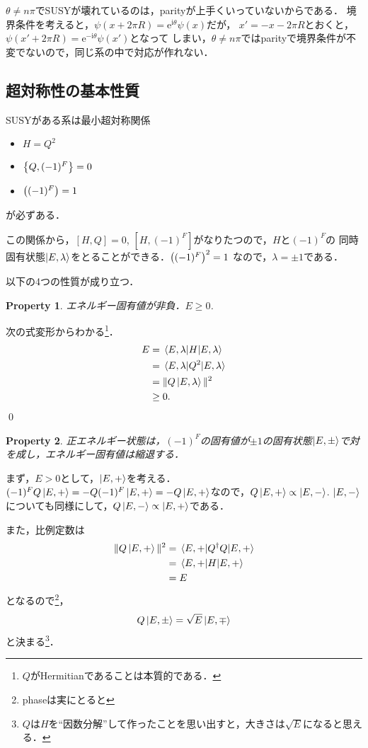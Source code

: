 \documentclass[english, dvipdfmx, a4paper]{jsarticle}
\theoremstyle{break}
\newtheorem{prop}{Property}
\renewcommand{\i}{\mathrm{i}}
\newcommand{\e}{\mathrm{e}}
\begin{document}
	$\theta \neq n\pi$でSUSYが壊れているのは，parityが上手くいっていないからである．
	境界条件を考えると，$\psi(x+2\pi R) = \e^{\i\theta}\psi(x)$だが，
	$x' = -x-2\pi R$とおくと，$\psi(x'+2\pi R)=\e^{-\i\theta}\psi(x')$となって
	しまい，$\theta\neq n\pi$ではparityで境界条件が不変でないので，同じ系の中で対応が作れない．
	\subsection{超対称性の基本性質}

	SUSYがある系は最小超対称関係
	\begin{itemize}
		\item $H=Q^2$
		\item $\qty{Q, (-1)^{F}}=0$
		\item $\qty((-1)^{F})=1$
	\end{itemize}
	が必ずある．

	この関係から，$[H, Q]=0$, $[H, (-1)^F]$がなりたつので，$H$と$(-1)^{F}$の
	同時固有状態$\ket{E, \lambda}$をとることができる．$\qty((-1)^{F})^2=1$
	なので，$\lambda = \pm1$である．



	以下の4つの性質が成り立つ．
	\begin{prop}
		エネルギー固有値が非負．$E\geq0$.
	\end{prop}
	次の式変形からわかる\footnote{$Q$がHermitianであることは本質的である．}．
	\begin{align}
		E &= \mel{E, \lambda}{H}{E, \lambda}\\
		  &= \mel{E, \lambda}{Q^2}{E, \lambda}\\
		  &= \|Q\ket{E, \lambda}\|^2\\
		  &\geq0.
	\end{align}\qed
	\begin{prop}
		正エネルギー状態は，$(-1)^{F}$の固有値が$\pm1$の固有状態$\ket{E, \pm}$で対を成し，エネルギー固有値は縮退する．
	\end{prop}
	まず，$E>0$として，$\ket{E, +}$を考える．
	$(-1)^{F}Q\ket{E, +} = -Q(-1)^{F}\ket{E, +} = -Q\ket{E, +}$なので，$Q\ket{E, +}\propto\ket{E, -}$.
	$\ket{E, -}$についても同様にして，$Q\ket{E, -}\propto\ket{E, +}$である．

	また，比例定数は	
	\begin{align}
		\|Q\ket{E,+}\|^2 &= \mel{E, +}{Q^{\dag}Q}{E, +}\\
						 &= \expval{H}{E, +}\\
						 &= E
	\end{align}
	となるので\footnote{phaseは実にとると}，
	\begin{equation}
		Q\ket{E,\pm} = \sqrt{E}\ket{E, \mp}\label{eq:normalization}
	\end{equation}
	と決まる\footnote{$Q$は$H$を``因数分解''して作ったことを思い出すと，大きさは$\sqrt{E}$になると思える．}．
	
\end{document}
